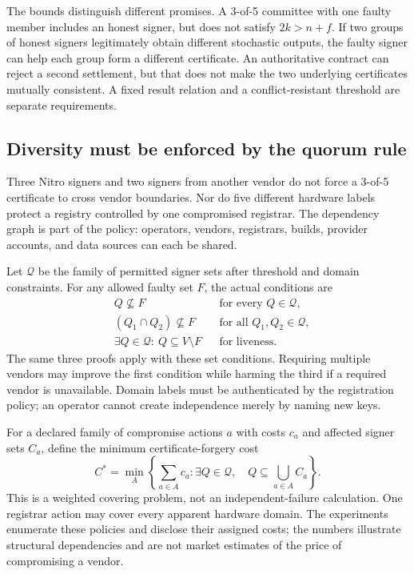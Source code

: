 The bounds distinguish different promises. A 3-of-5 committee with one faulty member includes an honest signer, but does not satisfy $2k>n+f$. If two groups of honest signers legitimately obtain different stochastic outputs, the faulty signer can help each group form a different certificate. An authoritative contract can reject a second settlement, but that does not make the two underlying certificates mutually consistent. A fixed result relation and a conflict-resistant threshold are separate requirements.

\subsection{Diversity must be enforced by the quorum rule}

Three Nitro signers and two signers from another vendor do not force a 3-of-5 certificate to cross vendor boundaries. Nor do five different hardware labels protect a registry controlled by one compromised registrar. The dependency graph is part of the policy: operators, vendors, registrars, builds, provider accounts, and data sources can each be shared.

Let $\mathcal Q$ be the family of permitted signer sets after threshold and domain constraints. For any allowed faulty set $F$, the actual conditions are
\begin{align}
&Q\not\subseteq F &&\text{for every }Q\in\mathcal Q,\label{eq:honestquorum}\\
&(Q_1\cap Q_2)\not\subseteq F &&\text{for all }Q_1,Q_2\in\mathcal Q,\label{eq:intersection}\\
&\exists Q\in\mathcal Q:\ Q\subseteq V\setminus F &&\text{for liveness}.\label{eq:liveness}
\end{align}
The same three proofs apply with these set conditions. Requiring multiple vendors may improve the first condition while harming the third if a required vendor is unavailable. Domain labels must be authenticated by the registration policy; an operator cannot create independence merely by naming new keys.

For a declared family of compromise actions $a$ with costs $c_a$ and affected signer sets $C_a$, define the minimum certificate-forgery cost
\[
C^*=\min_{A}\left\{\sum_{a\in A}c_a:
\exists Q\in\mathcal Q,\quad Q\subseteq\bigcup_{a\in A}C_a\right\}.
\]
This is a weighted covering problem, not an independent-failure calculation. One registrar action may cover every apparent hardware domain. The experiments enumerate these policies and disclose their assigned costs; the numbers illustrate structural dependencies and are not market estimates of the price of compromising a vendor.

